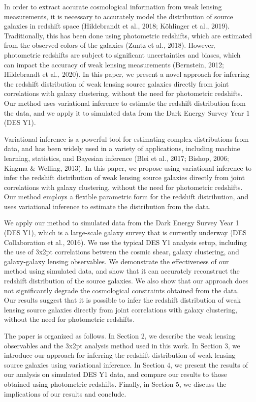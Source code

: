\documentclass[twocolumn,draft]{aastex631}
\begin{document}
In order to extract accurate cosmological information from weak lensing measurements, it is necessary to accurately model the distribution of source galaxies in redshift space (Hildebrandt et al., 2018; Köhlinger et al., 2019). Traditionally, this has been done using photometric redshifts, which are estimated from the observed colors of the galaxies (Zuntz et al., 2018). However, photometric redshifts are subject to significant uncertainties and biases, which can impact the accuracy of weak lensing measurements (Bernstein, 2012; Hildebrandt et al., 2020). In this paper, we present a novel approach for inferring the redshift distribution of weak lensing source galaxies directly from joint correlations with galaxy clustering, without the need for photometric redshifts. Our method uses variational inference to estimate the redshift distribution from the data, and we apply it to simulated data from the Dark Energy Survey Year 1 (DES Y1).

Variational inference is a powerful tool for estimating complex distributions from data, and has been widely used in a variety of applications, including machine learning, statistics, and Bayesian inference (Blei et al., 2017; Bishop, 2006; Kingma \& Welling, 2013). In this paper, we propose using variational inference to infer the redshift distribution of weak lensing source galaxies directly from joint correlations with galaxy clustering, without the need for photometric redshifts. Our method employs a flexible parametric form for the redshift distribution, and uses variational inference to estimate the distribution from the data.

We apply our method to simulated data from the Dark Energy Survey Year 1 (DES Y1), which is a large-scale galaxy survey that is currently underway (DES Collaboration et al., 2016). We use the typical DES Y1 analysis setup, including the use of 3x2pt correlations between the cosmic shear, galaxy clustering, and galaxy-galaxy lensing observables. We demonstrate the effectiveness of our method using simulated data, and show that it can accurately reconstruct the redshift distribution of the source galaxies. We also show that our approach does not significantly degrade the cosmological constraints obtained from the data. Our results suggest that it is possible to infer the redshift distribution of weak lensing source galaxies directly from joint correlations with galaxy clustering, without the need for photometric redshifts.

The paper is organized as follows. In Section 2, we describe the weak lensing observables and the 3x2pt analysis method used in this work. In Section 3, we introduce our approach for inferring the redshift distribution of weak lensing source galaxies using variational inference. In Section 4, we present the results of our analysis on simulated DES Y1 data, and compare our results to those obtained using photometric redshifts. Finally, in Section 5, we discuss the implications of our results and conclude.
\end{document}
